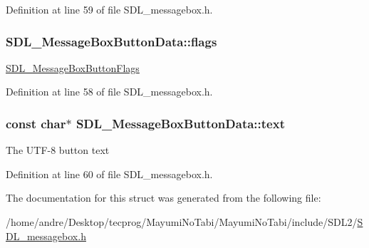 Definition at line 59 of file S\-D\-L\-\_\-messagebox.\-h.

\hypertarget{struct_s_d_l___message_box_button_data_a426c8b5da0e718242c7840706d95de0b}{
\subsubsection[{flags}]{ S\-D\-L\-\_\-\-Message\-Box\-Button\-Data\-::flags}}\label{struct_s_d_l___message_box_button_data_a426c8b5da0e718242c7840706d95de0b}
\hyperlink{_s_d_l__messagebox_8h_ad21beffe204426be6efbf4990c916ad0}{S\-D\-L\-\_\-\-Message\-Box\-Button\-Flags} 

Definition at line 58 of file S\-D\-L\-\_\-messagebox.\-h.

\hypertarget{struct_s_d_l___message_box_button_data_af35f3062f0577159284c8828caaf08e4}{
\subsubsection[{text}]{\setlength{\rightskip}{0pt plus 5cm}const char$\ast$ S\-D\-L\-\_\-\-Message\-Box\-Button\-Data\-::text}}\label{struct_s_d_l___message_box_button_data_af35f3062f0577159284c8828caaf08e4}
The U\-T\-F-\/8 button text 

Definition at line 60 of file S\-D\-L\-\_\-messagebox.\-h.



The documentation for this struct was generated from the following file\-:\begin{DoxyCompactItemize}
\item 
/home/andre/\-Desktop/tecprog/\-Mayumi\-No\-Tabi/\-Mayumi\-No\-Tabi/include/\-S\-D\-L2/\hyperlink{_s_d_l__messagebox_8h}{S\-D\-L\-\_\-messagebox.\-h}\end{DoxyCompactItemize}
